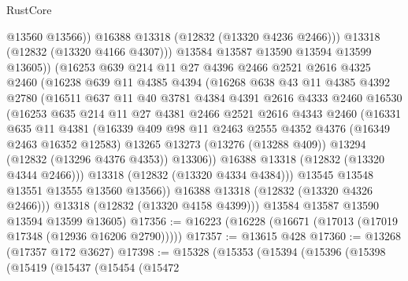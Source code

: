 \begin{lexlean}{RustCore}
\begin{coremodule}
                    @13560
                    @13566))
                @16388
                @13318
                (@12832 (@13320 @4236 @2466)))
              @13318
              (@12832 (@13320 @4166 @4307)))
            @13584
            @13587
            @13590
            @13594
            @13599
            @13605))
        (@16253
          @639
          @214
          @11
          @27
          @4396
          @2466
          @2521
          @2616
          @4325
          @2460
          (@16238
            @639
            @11
            @4385
            @4394
            (@16268
              @638
              @43
              @11
              @4385
              @4392
              @2780
              (@16511
                @637
                @11
                @40
                @3781
                @4384
                @4391
                @2616
                @4333
                @2460
                @16530
                (@16253
                  @635
                  @214
                  @11
                  @27
                  @4381
                  @2466
                  @2521
                  @2616
                  @4343
                  @2460
                  (@16331
                    @635
                    @11
                    @4381
                    (@16339
                      @409
                      @98
                      @11
                      @2463
                      @2555
                      @4352
                      @4376
                      (@16349 @2463 @16352 @12583)
                      @13265
                      @13273
                      (@13276 (@13288 @409))
                      @13294
                      (@12832 (@13296 @4376 @4353))
                      @13306))
                  @16388
                  @13318
                  (@12832 (@13320 @4344 @2466)))
                @13318
                (@12832 (@13320 @4334 @4384)))
              @13545
              @13548
              @13551
              @13555
              @13560
              @13566))
          @16388
          @13318
          (@12832 (@13320 @4326 @2466)))
        @13318
        (@12832 (@13320 @4158 @4399)))
      @13584
      @13587
      @13590
      @13594
      @13599
      @13605)
@17356 := @16223 (@16228 (@16671 (@17013 (@17019 @17348 (@12936 @16206 @2790)))))
@17357 := @13615 @428
@17360 := @13268 (@17357 @172 @3627)
@17398 := @15328
    (@15353
      (@15394
        (@15396
          (@15398
            (@15419
              (@15437
                (@15454
                  (@15472

\end{coremodule}
\end{lexlean}
